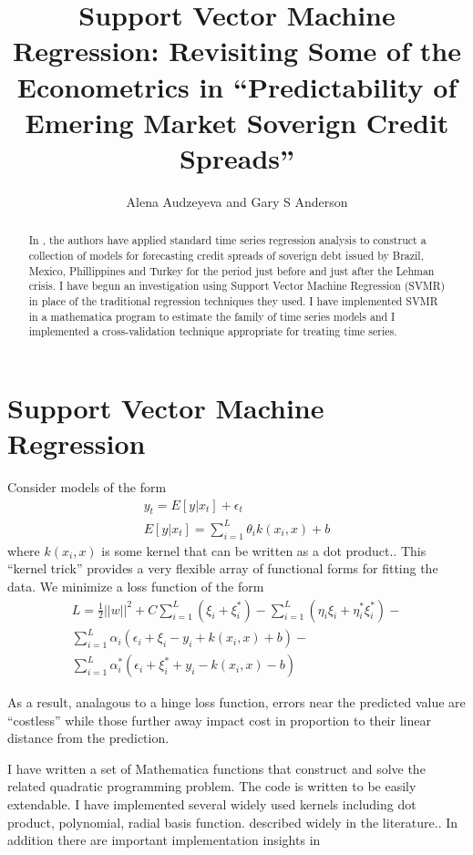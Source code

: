 \documentclass[12pt]{article}
\author{Alena Audzeyeva and Gary S Anderson}
\title{Support Vector Machine Regression:   Revisiting Some of the Econometrics in ``Predictability of Emering Market Soverign Credit Spreads''}
\begin{document}
\maketitle

\begin{abstract}
In \cite{audzeyeva15:predic}, the
  authors have applied standard time series regression analysis
 to construct a  collection of models for forecasting
  credit spreads of soverign debt
  issued by Brazil, Mexico, Phillippines and Turkey for the period
  just before and just after the Lehman crisis.
I have begun an investigation
using Support Vector Machine Regression (SVMR) in place of the
traditional regression techniques they used. 
I have implemented SVMR in a mathematica
program to estimate the family of time series models and I
implemented a cross-validation technique appropriate for treating
time series.\cite{racine00:_consis}
\end{abstract}
\newpage


\section{Support Vector Machine Regression}


Consider models of the form 
\begin{gather}
y_t=E[y|x_t]+ \epsilon_t\\
E[y|x_t]= \sum_{i=1}^L\theta_ik(x_i,x)+b
\end{gather}
where $k(x_i,x)$ is some kernel that can be written as a dot product.\cite{hofmann06kernelreview}.  This ``kernel trick'' provides a very flexible array of
functional forms for fitting the data.
We minimize a loss function of the form
\begin{gather}
L=\frac{1}{2}||w||^2 + C \sum_{i=1}^L (\xi_i+\xi_i^\ast) - \sum_{i=1}^L (\eta_i\xi_i+\eta_i^\ast \xi_i^\ast) -\\
\sum_{i=1}^L \alpha_i(\epsilon_i +\xi_i - y_i + k(x_i,x) +b)- \nonumber\\
\sum_{i=1}^L \alpha_i^\ast(\epsilon_i +\xi_i^\ast + y_i - k(x_i,x) -b)\nonumber
\end{gather}

As a result, analagous to a  hinge loss function, 
errors near the predicted value are ``costless'' while those further away
impact cost in proportion to their linear distance from the prediction.

I have written a set of Mathematica functions that 
construct and solve the related quadratic programming problem.
The code is written to be easily extendable.
I have implemented several widely used kernels including dot product, 
polynomial, radial basis function.
described widely in the literature.\cite{palancz05:suppor,smola2004tutorial,Alpaydin2004}. In addition there are important implementation insights in\cite{platt98sequential}
\end{document}
